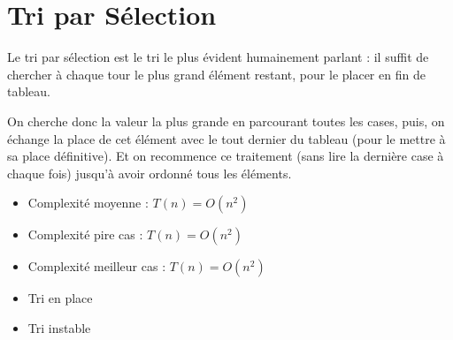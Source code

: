 \documentclass[11pt,a4paper]{article}
\begin{document}
\vfillFirst
\vfillLast


\section{Tri par Sélection}

\medskip

Le tri par sélection est le tri le plus évident humainement parlant : il suffit de chercher à chaque tour le plus grand élément restant, pour le placer en fin de tableau.

\medskip

On cherche donc la valeur la plus grande en parcourant toutes les cases, puis, on échange la place de cet élément avec le tout dernier du tableau (pour le mettre à sa place définitive).
Et on recommence ce traitement (sans lire la dernière case à chaque fois) jusqu'à avoir ordonné tous les éléments.

\medskip

\begin{itemize}
\item Complexité moyenne : $ T(n) = O(n^{2}) $
\item Complexité pire cas : $ T(n) = O(n^{2}) $
\item Complexité meilleur cas : $ T(n) = O(n^{2}) $
\item Tri en place
\item Tri instable
\end{itemize}


\clearpage


\vfillFirst
\end{document}
